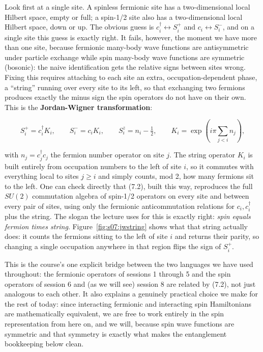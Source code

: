 Look first at a single site. A spinless fermionic site has a two-dimensional local Hilbert space, empty
or full; a spin-1/2 site also has a two-dimensional local Hilbert space, down or up. The obvious guess
is $c_i^\dagger \leftrightarrow S_i^+$ and $c_i \leftrightarrow S_i^-$, and on a single site this guess
is exactly right. It fails, however, the moment we have more than one site, because fermionic
many-body wave functions are antisymmetric under particle exchange while spin many-body wave functions
are symmetric (bosonic): the naive identification gets the relative signs between sites wrong. Fixing
this requires attaching to each site an extra, occupation-dependent phase, a ``string'' running over
every site to its left, so that exchanging two fermions produces exactly the minus sign the spin
operators do not have on their own. This is the \textbf{Jordan-Wigner transformation}:

\begin{equation}
S_i^+ = c_i^\dagger K_i, \qquad S_i^- = c_i K_i, \qquad S_i^z = n_i - \tfrac{1}{2}, \qquad
K_i = \exp\!\left(i\pi \sum_{j<i} n_j\right),
\end{equation}

with $n_j = c_j^\dagger c_j$ the fermion number operator on site $j$. The string operator $K_i$ is built
entirely from occupation numbers to the left of site $i$, so it commutes with everything local to sites
$j \ge i$ and simply counts, mod 2, how many fermions sit to the left. One can check directly that
(7.2), built this way, reproduces the full $SU(2)$ commutation algebra of spin-1/2 operators on every
site and between every pair of sites, using only the fermionic anticommutation relations for $c_i,
c_i^\dagger$ plus the string. The slogan the lecture uses for this is exactly right: \emph{spin equals
fermion times string}. Figure~\ref{fig:s07:jwstring} shows what that string actually does: it counts
the fermions sitting to the left of site $i$ and returns their parity, so changing a single occupation
anywhere in that region flips the sign of $S_i^+$.



This is the course's one explicit bridge between the two languages we have used throughout: the
fermionic operators of sessions 1 through 5 and the spin operators of session 6 and (as we will see)
session 8 are related by (7.2), not just analogous to each other. It also explains a genuinely
practical choice we make for the rest of today: since interacting fermionic and interacting spin
Hamiltonians are mathematically equivalent, we are free to work entirely in the spin representation
from here on, and we will, because spin wave functions are symmetric and that symmetry is exactly what
makes the entanglement bookkeeping below clean.

